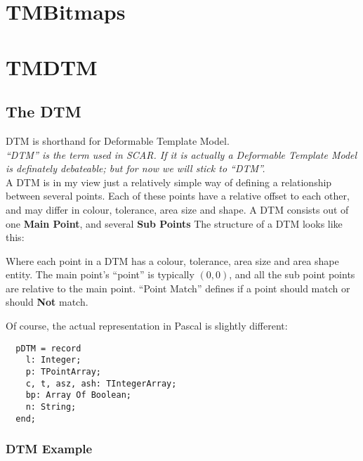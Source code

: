 \documentclass[a4paper, 10pt]{report} %
\begin{document}


\section{TMBitmaps}

\section{TMDTM}

\subsection{The DTM}

DTM is shorthand for Deformable Template Model. \\

\emph{``DTM'' is the term used in SCAR. If it is actually a Deformable Template
Model is definately debateable; but for now we will stick to ``DTM''.} \\

A DTM is in my view just a relatively simple way of defining a relationship
between several points. Each of these points have a relative offset to each
other, and may differ in colour, tolerance, area size and shape.
A DTM consists out of one \textbf{Main Point}, and several \textbf{Sub Points}
The structure of a DTM looks like this:


Where each point in a DTM has a colour, tolerance, area size and area shape
entity. The main point's ``point'' is typically $ (0, 0) $, and all the
sub point points are relative to the main point. ``Point Match'' defines if a point should match or should \textbf{Not} match.

Of course, the actual representation in Pascal is slightly different:


\begin{verbatim}
  pDTM = record
    l: Integer;
    p: TPointArray;
    c, t, asz, ash: TIntegerArray;
    bp: Array Of Boolean;
    n: String;
  end;
\end{verbatim}

\subsubsection{DTM Example}
\end{document}
